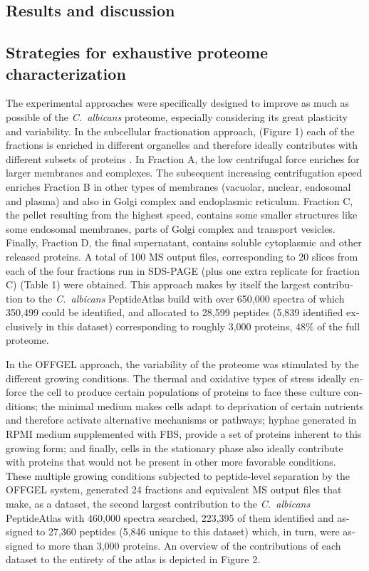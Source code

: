 \begin{otherlanguage}{british}
\section*{Results and discussion}


\subsection*{Strategies for exhaustive proteome characterization}

The experimental approaches were specifically designed to improve as much as possible of
the \textit{\mbox{C. albicans}} proteome, especially considering its great plasticity and variability.
In the subcellular fractionation approach, (Figure 1) each of the fractions is enriched in
different organelles and therefore ideally contributes with different subsets of proteins \citep{Harford2001}.
In Fraction A, the low centrifugal force enriches for larger membranes and complexes. The
subsequent increasing centrifugation speed enriches Fraction B in other types of membranes
(vacuolar, nuclear, endosomal and plasma) and also in Golgi complex and endoplasmic
reticulum. Fraction C, the pellet resulting from the highest speed, contains some smaller
structures like some endosomal membranes, parts of Golgi complex and transport vesicles.
Finally, Fraction D, the final supernatant, contains soluble cytoplasmic and other released
proteins. A total of 100 MS output files, corresponding to 20 slices from each of the four
fractions run in SDS-PAGE (plus one extra replicate for fraction C) (Table 1) were obtained.
This approach makes by itself the largest contribution to the \textit{\mbox{C. albicans}} PeptideAtlas build
with over 650,000 spectra of which 350,499 could be identified, and allocated to 28,599
peptides (5,839 identified exclusively in this dataset) corresponding to roughly 3,000
proteins, 48\% of the full proteome.

In the OFFGEL approach, the variability of the proteome was stimulated by the different
growing conditions. The thermal and oxidative types of stress ideally enforce the cell to
produce certain populations of proteins to face these culture conditions; the minimal medium
makes cells adapt to deprivation of certain nutrients and therefore activate alternative
mechanisms or pathways; hyphae generated in RPMI medium supplemented with FBS,
provide a set of proteins inherent to this growing form; and finally, cells in the stationary
phase also ideally contribute with proteins that would not be present in other more favorable
conditions. These multiple growing conditions subjected to peptide-level separation by the
OFFGEL system, generated 24 fractions and equivalent MS output files that make, as a
dataset, the second largest contribution to the \textit{\mbox{C. albicans}} PeptideAtlas with 460,000 spectra
searched, 223,395 of them identified and assigned to 27,360 peptides (5,846 unique to this
dataset) which, in turn, were assigned to more than 3,000 proteins. An overview of the
contributions of each dataset to the entirety of the atlas is depicted in Figure 2.



\end{otherlanguage}
